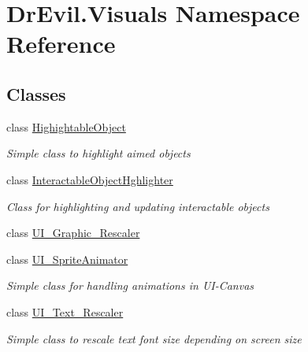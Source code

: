 \hypertarget{namespace_dr_evil_1_1_visuals}{}\section{Dr\+Evil.\+Visuals Namespace Reference}
\label{namespace_dr_evil_1_1_visuals}
\subsection*{Classes}
\begin{DoxyCompactItemize}
\item 
class \mbox{\hyperlink{class_dr_evil_1_1_visuals_1_1_highightable_object}{Highightable\+Object}}
\begin{DoxyCompactList}\small\item\em Simple class to highlight aimed objects \end{DoxyCompactList}\item 
class \mbox{\hyperlink{class_dr_evil_1_1_visuals_1_1_interactable_object_hghlighter}{Interactable\+Object\+Hghlighter}}
\begin{DoxyCompactList}\small\item\em Class for highlighting and updating interactable objects \end{DoxyCompactList}\item 
class \mbox{\hyperlink{class_dr_evil_1_1_visuals_1_1_u_i___graphic___rescaler}{U\+I\+\_\+\+Graphic\+\_\+\+Rescaler}}
\item 
class \mbox{\hyperlink{class_dr_evil_1_1_visuals_1_1_u_i___sprite_animator}{U\+I\+\_\+\+Sprite\+Animator}}
\begin{DoxyCompactList}\small\item\em Simple class for handling animations in U\+I-\/\+Canvas \end{DoxyCompactList}\item 
class \mbox{\hyperlink{class_dr_evil_1_1_visuals_1_1_u_i___text___rescaler}{U\+I\+\_\+\+Text\+\_\+\+Rescaler}}
\begin{DoxyCompactList}\small\item\em Simple class to rescale text font size depending on screen size \end{DoxyCompactList}\end{DoxyCompactItemize}
